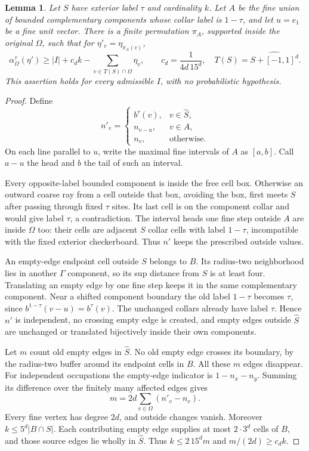 \documentclass[11pt,a4paper]{article}
\newtheorem{lemma}[theorem]{Lemma}
\numberwithin{equation}{section}
\begin{document}
\begin{lemma}\label{lem:transport}
Let $S$ have exterior label $\tau$ and cardinality $k$.
Let $A$ be the fine union of bounded complementary components whose
collar label is $1-\tau$, and let $u=e_1$ be a fine unit vector.
There is a finite permutation $\pi_A$, supported inside the original
$\Omega$, such that for $\eta'_v=\eta_{\pi_A(v)}$,
\begin{equation}\label{eq:projected-comparison}
 \alpha_\Omega^\tau(\eta')\ge |I|+
 c_d k-\sum_{v\in T(S)\cap\Omega}\eta_v,\qquad
 c_d=\frac1{4d\,15^d},\quad T(S)=\widehat{S+[-1,1]^d}.
\end{equation}
This assertion holds for every admissible $I$, with no probabilistic
hypothesis.
\end{lemma}
\begin{proof}
Define
\[
 n'_v=\begin{cases}
 b^\tau(v),&v\in\widehat S,\\
 n_{v-u},&v\in A,\\
 n_v,&\text{otherwise}.
 \end{cases}
\]
On each line parallel to $u$, write the maximal fine intervals of $A$
as $[a,b]$. Call $a-u$ the head and $b$ the tail of such an interval.

Every opposite-label bounded component is inside the free cell box.
Otherwise an outward coarse ray from a cell outside that box, avoiding
the box, first meets $S$ after passing through fixed $\tau$ sites.
Its last cell is on the component collar and would give label $\tau$,
a contradiction. The interval heads one fine step outside $A$ are
inside $\Omega$ too: their cells are adjacent $S$ collar cells with
label $1-\tau$, incompatible with the fixed exterior checkerboard.
Thus $n'$ keeps the prescribed outside values.

An empty-edge endpoint cell outside $S$ belongs to $B$. Its radius-two
neighborhood lies in another $\Gamma$ component, so its sup distance
from $S$ is at least four. Translating an empty edge by one fine step
keeps it in the same complementary component.
Near a shifted component boundary the old label $1-\tau$ becomes
$\tau$, since $b^{1-\tau}(v-u)=b^\tau(v)$.
The unchanged collars already have label $\tau$.
Hence $n'$ is independent, no crossing empty edge is created, and
empty edges outside $\widehat S$ are unchanged or translated
bijectively inside their own components.

Let $m$ count old empty edges in $\widehat S$.
No old empty edge crosses its boundary, by the radius-two buffer around
its endpoint cells in $B$.
All these $m$ edges disappear. For independent occupations the empty-edge
indicator is $1-n_x-n_y$. Summing its difference over the finitely many
affected edges gives
\begin{equation}\label{eq:edge-identity}
 m=2d\sum_{v\in\Omega}(n'_v-n_v).
\end{equation}
Every fine vertex has degree $2d$, and outside changes vanish.
Moreover $k\le5^d|B\cap S|$. Each contributing empty edge supplies at most
$2\cdot3^d$ cells of $B$, and those source edges lie wholly in $\widehat S$.
Thus $k\le2\,15^d m$ and $m/(2d)\ge c_d k$.


\end{proof}
\end{document}
